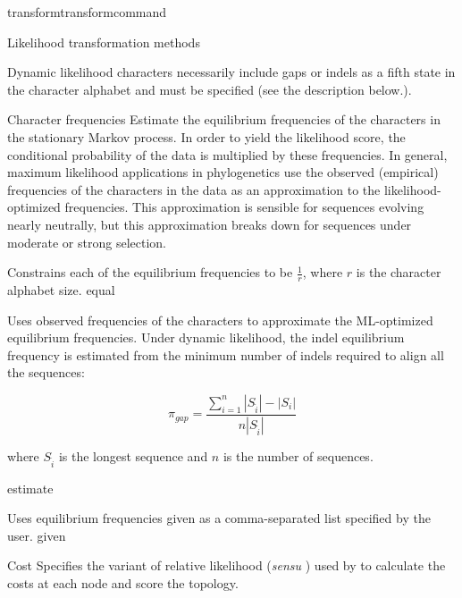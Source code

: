 \begin{command}{transform}{transformcommand}
\begin{arguments}
\begin{argumentgroup}{Likelihood transformation methods}
\begin{statement}
Dynamic likelihood characters necessarily include gaps or indels as
a fifth state in the character alphabet and  must be specified
(see the description  below.).
\end{statement}

\end{argumentgroup}

\begin{argumentgroup} {Character frequencies} %
Estimate the equilibrium frequencies of the characters in the 
stationary Markov process. In order to yield the likelihood score, 
the conditional probability of the data is multiplied by these frequencies. 
In general, maximum likelihood applications in phylogenetics 
use the observed (empirical) frequencies of the characters in the data as an
approximation to the likelihood-optimized frequencies. This
approximation is sensible for sequences evolving nearly
neutrally, but this approximation breaks down for sequences
under moderate or strong selection.

{Constrains each of the equilibrium frequencies to be
$\frac{1}{r}$, where $r$ is the character alphabet size.}
{equal}

{Uses observed frequencies of the characters to
approximate the ML-optimized equilibrium
frequencies. Under dynamic likelihood, the indel
equilibrium frequency is estimated from the minimum
number of indels required to align all the
sequences: 

\begin{equation*}
\pi_{gap} = \frac{\sum_{i=1}^n
|S_{\hat{i}}| - |S_i|}{n |S_{\hat{i}}|}
\end{equation*}

where
$S_{\hat{i}}$ is the longest sequence and $n$ is the number of sequences.}
{estimate}

{Uses equilibrium frequencies given as a
comma-separated list specified by the user.} 
{given}

\end{argumentgroup}


\begin {argumentgroup} {Cost}
Specifies the variant of relative likelihood (\textit{sensu}
\cite{steel2000parsimony}) used by \poy to calculate the costs at
each node and score the topology.


\end{argumentgroup}
\end{arguments}
\end{command}

